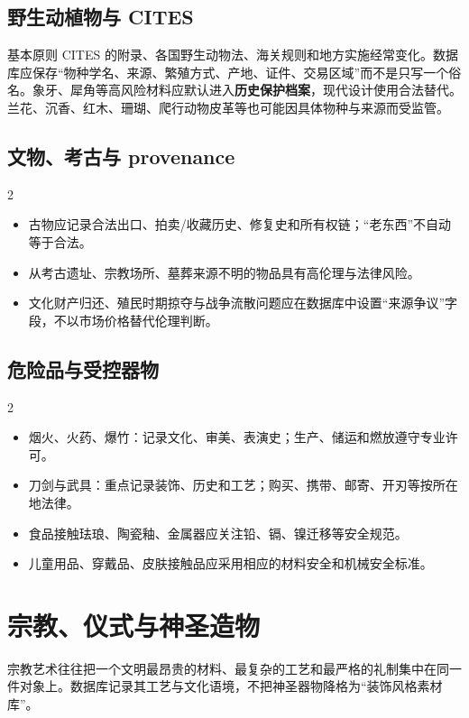 \documentclass[lang=en,a4paper,11pt]{elegantpaper}
\begin{document}
\subsection{野生动植物与 CITES}


\begin{legalbox}{基本原则}
CITES 的附录、各国野生动物法、海关规则和地方实施经常变化。数据库应保存“物种学名、来源、繁殖方式、产地、证件、交易区域”而不是只写一个俗名。象牙、犀角等高风险材料应默认进入\textbf{历史保护档案}，现代设计使用合法替代。兰花、沉香、红木、珊瑚、爬行动物皮革等也可能因具体物种与来源而受监管。
\end{legalbox}

\subsection{文物、考古与 provenance}


\begin{multicols}{2}
\begin{itemize}
\item 古物应记录合法出口、拍卖/收藏历史、修复史和所有权链；“老东西”不自动等于合法。
\item 从考古遗址、宗教场所、墓葬来源不明的物品具有高伦理与法律风险。
\item 文化财产归还、殖民时期掠夺与战争流散问题应在数据库中设置“来源争议”字段，不以市场价格替代伦理判断。
\end{itemize}
\end{multicols}

\subsection{危险品与受控器物}


\begin{multicols}{2}
\begin{itemize}
\item 烟火、火药、爆竹：记录文化、审美、表演史；生产、储运和燃放遵守专业许可。
\item 刀剑与武具：重点记录装饰、历史和工艺；购买、携带、邮寄、开刃等按所在地法律。
\item 食品接触珐琅、陶瓷釉、金属器应关注铅、镉、镍迁移等安全规范。
\item 儿童用品、穿戴品、皮肤接触品应采用相应的材料安全和机械安全标准。
\end{itemize}
\end{multicols}


\section{宗教、仪式与神圣造物}
宗教艺术往往把一个文明最昂贵的材料、最复杂的工艺和最严格的礼制集中在同一件对象上。数据库记录其工艺与文化语境，不把神圣器物降格为“装饰风格素材库”。
\end{document}
